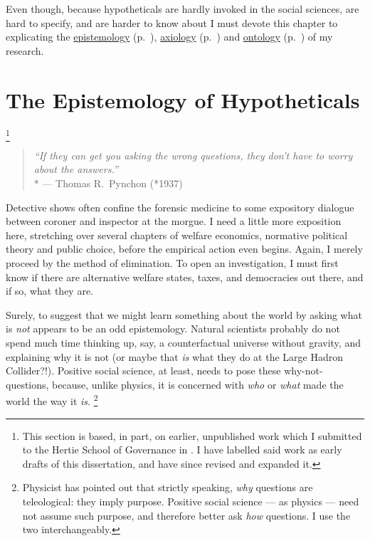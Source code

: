 Even though, because hypotheticals are hardly invoked in the social sciences, are hard to specify, and are harder to know about I must devote this chapter to explicating the \hyperref[sec:epistemology]{epistemology} (p.~\pageref{sec:epistemology}), \hyperref[sec:axiology]{axiology} (p.~\pageref{sec:axiology}) and \hyperref[sec:ontology]{ontology} (p.~\pageref{sec:ontology}) of my research.

\section[Epistemology]{The Epistemology of Hypotheticals}
	\label{sec:epistemology}
\footnote{
	\label{fn:also-in-europe}
	This section is based, in part, on earlier, unpublished work which I submitted to the Hertie School of Governance in \cite{Held2012a}.
	I have labelled said work as early drafts of this dissertation, and have since revised and expanded it.
}

\begin{quote}
	\emph{``If they can get you asking the wrong questions, they don't have to worry about the answers.''}
	\\*
	--- Thomas R.~Pynchon (*1937)
\end{quote}

Detective shows often confine the forensic medicine to some expository dialogue between coroner and inspector at the morgue.
I need a little more exposition here, stretching over several chapters of welfare economics, normative political theory and public choice, before the empirical action even begins.
Again, I merely proceed by the method of elimination.
To open an investigation, I must first know if there are alternative welfare states, taxes, and democracies out there, and if so, what they are.

Surely, to suggest that we might learn something about the world by asking what is \emph{not} appears to be an odd epistemology.
Natural scientists probably do not spend much time thinking up, say, a counterfactual universe without gravity, and explaining why it is not (or maybe that \emph{is} what they do at the Large Hadron Collider?!).
Positive social science, at least, needs to pose these why-not-questions, because, unlike physics, it is concerned with \emph{who} or \emph{what} made the world the way it \emph{is}.
\footnote{
	Physicist \citet{Krauss2012} has pointed out that strictly speaking, \emph{why} questions are teleological:
	they imply purpose.
	Positive social science --- as physics --- need not assume such purpose, and therefore better ask \emph{how} questions.
	I use the two interchangeably.
}

